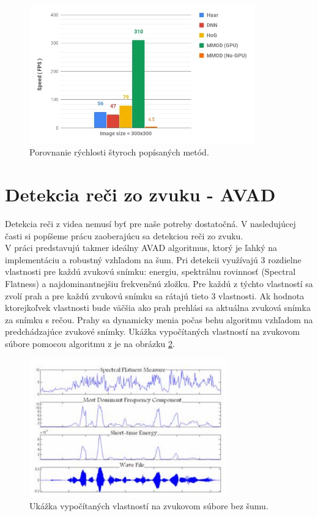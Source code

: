 \begin{figure}[H]
	\begin{center}
		\includegraphics[height=6cm]{pics/face-detection-speed-comparison.jpg}
		\caption{Porovnanie rýchlosti štyroch popísaných metód.
		 \cite{OpenCVvsDlib}}
		\label{pic-face-detection-speed-comparison}
	\end{center}
\end{figure}

\section{Detekcia reči zo zvuku - AVAD}
Detekcia reči z videa nemusí byť pre naše potreby dostatočná. V nasledujúcej časti si popíšeme prácu zaoberajúcu sa detekciou reči zo zvuku.\\

V práci \cite{moattar2009simple} predstavujú takmer ideálny AVAD algoritmus, ktorý je ľahký na implementáciu a robustný vzhľadom na šum.
Pri detekcii využívajú 3 rozdielne vlastnosti pre každú zvukovú snímku: energiu, spektrálnu rovinnosť (Spectral Flatness) a najdominantnejšiu frekvenčnú zložku.
Pre každú z týchto vlastností sa zvolí prah a pre každú zvukovú snímku sa rátajú tieto 3 vlastnosti.
Ak hodnota ktorejkoľvek vlastnosti bude väčšia ako prah prehlási sa aktuálna zvuková snímka za snímku s rečou.
Prahy sa dynamicky menia počas behu algoritmu vzhľadom na predchádzajúce zvukové snímky.
Ukážka vypočítaných vlastností na zvukovom súbore pomocou algoritmu z \cite{moattar2009simple} je na obrázku \ref{pic-avad}.

\begin{figure}[H]
	\begin{center}
		\includegraphics[height=6cm]{pics/avad.png}
		\caption{Ukážka vypočítaných vlastností na zvukovom súbore bez šumu.
		 \cite{moattar2009simple}}
		\label{pic-avad}
	\end{center}
\end{figure}

